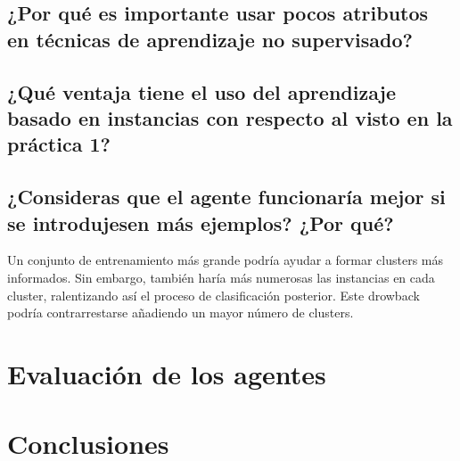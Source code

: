 \documentclass[12pt]{article}
\begin{document}
\subsection{¿Por qué es importante usar pocos atributos en técnicas de aprendizaje no supervisado?}


\subsection{¿Qué ventaja tiene el uso del aprendizaje basado en instancias con respecto al visto en la práctica 1?}


\subsection{¿Consideras que el agente funcionaría mejor si se introdujesen más ejemplos? ¿Por qué?}

Un conjunto de entrenamiento más grande podría ayudar a formar clusters más informados. Sin embargo, también haría más numerosas las instancias en cada cluster, ralentizando así el proceso de clasificación posterior. Este drowback podría contrarrestarse añadiendo un mayor número de clusters.

\section{Evaluación de los agentes}





\newpage
\section{Conclusiones}
\end{document}
